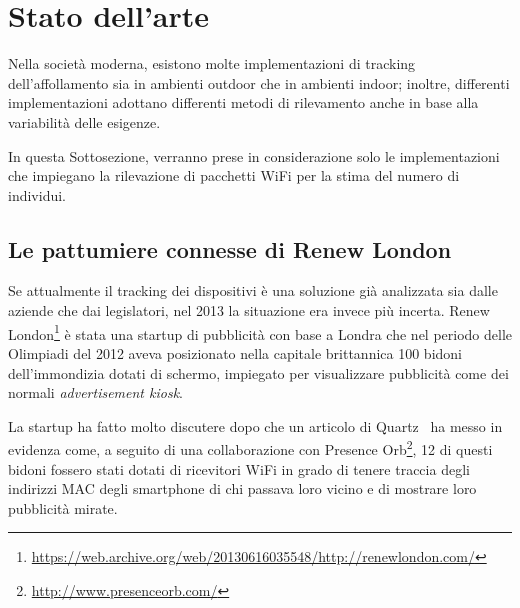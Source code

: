 \section{Stato dell'arte}\label{sec:state-of-art}




Nella società moderna, esistono molte implementazioni di tracking dell'affollamento sia in ambienti outdoor che in ambienti indoor;
inoltre, differenti implementazioni adottano differenti metodi di rilevamento anche in base alla variabilità delle esigenze.

In questa Sottosezione, verranno prese in considerazione solo le implementazioni che impiegano la rilevazione di pacchetti WiFi per la stima del numero di individui.

\subsection[Renew London \& Presence Orb]{Le pattumiere connesse di Renew London}

Se attualmente il tracking dei dispositivi è una soluzione già analizzata sia dalle aziende che dai legislatori, nel 2013 la situazione era invece più incerta.
Renew London\footnote{\url{https://web.archive.org/web/20130616035548/http://renewlondon.com/}} è stata una startup di pubblicità con base a Londra
che nel periodo delle Olimpiadi del 2012 aveva posizionato nella capitale brittannica 100 bidoni dell'immondizia dotati di schermo, impiegato per visualizzare pubblicità come dei normali \textit{advertisement kiosk}.

La startup ha fatto molto discutere dopo che un articolo di Quartz~\cite{Datoo2013} ha messo in evidenza come, a seguito di una collaborazione con Presence Orb\footnote{\url{http://www.presenceorb.com/}},
12 di questi bidoni fossero stati dotati di ricevitori WiFi in grado di tenere traccia degli indirizzi MAC degli smartphone di chi passava loro vicino e di mostrare loro pubblicità mirate.

